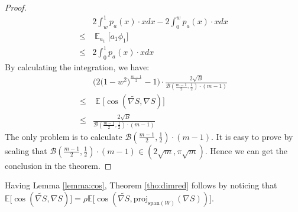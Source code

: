 \begin{proof}
\begin{align}
    &2\int_{w}^{1} p_a(x)\cdot xdx - 2\int_0^w p_a(x)\cdot xdx\\
    \leq& \mathop{\mathbb{E}}_{a_1} \big[ a_1\phi_1 \big]\\
    \leq& 2\int_0^1 p_a(x)\cdot xdx
\end{align}
By calculating the integration, we have:
\begin{align}
&\bigg( 2\bigg(1-w^2\bigg)^{\frac{m-1}{2}} - 1 \bigg) \cdot \frac{2\sqrt{B}}{\mathcal{B}(\frac{m-1}2, \frac12)\cdot(m-1)}\\
\leq& \mathop{\mathbb{E}}\big[ \cos (\widetilde{\nabla S}, \nabla S)\big]\\
\leq& \frac{2\sqrt{B}}{\mathcal{B}(\frac{m-1}2, \frac12)\cdot(m-1)}
\end{align}
The only problem is to calculate $\mathcal{B}(\frac{m-1}2, \frac12)\cdot(m-1)$. It is easy to prove by scaling that $\mathcal{B}(\frac{m-1}2, \frac12)\cdot(m-1) \in (2\sqrt{m}, \pi \sqrt{m})$. Hence we can get the conclusion in the theorem.
\end{proof}

Having Lemma \ref{lemma:cos}, Theorem \ref{tho:dimred} follows by noticing that $\mathbb{E}\big[\cos (\widetilde{\nabla S}, \nabla S) \big]=\rho\mathbb{E}\big[\cos (\widetilde{\nabla S}, \text{proj}_{\text{span}(W)}(\nabla S)) \big]$.


